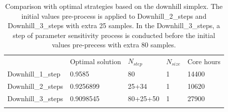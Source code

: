 \documentclass[gmd, manuscript]{copernicus}
\begin{document}
\begin{table}[t]
\caption{Comparison with optimal strategies based on the downhill simplex. The initial values pre-process is applied to Downhill\_2\_steps and Downhill\_3\_steps with extra 25 samples. In the Downhill\_3\_steps, a step of parameter sensitivity process is conducted before the initial values pre-precess with extra 80 samples.}
\begin{tabular}{l l l l l}
\tophline
  & Optimal solution & $N_{step}$ & $N_{size}$ & Core hours \\
\middlehline
Downhill\_1\_step & 0.9585    & 80         & 1  & 14400 \\
Downhill\_2\_steps  & 0.9256899 & 25+34    &  1 & 10620 \\
Downhill\_3\_steps  & 0.9098545 & 80+25+50 &  1 & 27900 \\
\bottomhline
\end{tabular}
\belowtable{} %
\end{table}



\clearpage






\end{document}
